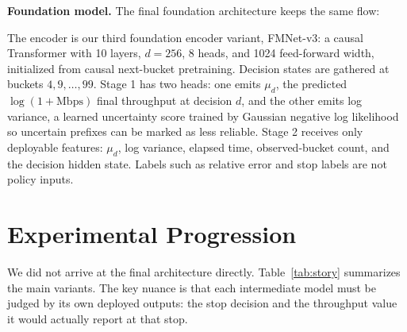 \documentclass[10pt,twocolumn]{article}
\newcommand{\mbps}{\mathrm{Mbps}}
\begin{document}
\textbf{Foundation model.} The final foundation architecture keeps the same flow:
\begin{center}
\end{center}
The encoder is our third foundation encoder variant, FMNet-v3: a causal Transformer with 10 layers, $d=256$, 8 heads, and 1024 feed-forward width, initialized from causal next-bucket pretraining. Decision states are gathered at buckets $4,9,\ldots,99$. Stage 1 has two heads: one emits $\mu_d$, the predicted $\log(1+\mbps)$ final throughput at decision $d$, and the other emits log variance, a learned uncertainty score trained by Gaussian negative log likelihood so uncertain prefixes can be marked as less reliable. Stage 2 receives only deployable features: $\mu_d$, log variance, elapsed time, observed-bucket count, and the decision hidden state. Labels such as relative error and stop labels are not policy inputs.

\section{Experimental Progression}
We did not arrive at the final architecture directly. Table~\ref{tab:story} summarizes the main variants. The key nuance is that each intermediate model must be judged by its own deployed outputs: the stop decision and the throughput value it would actually report at that stop.
\end{document}
